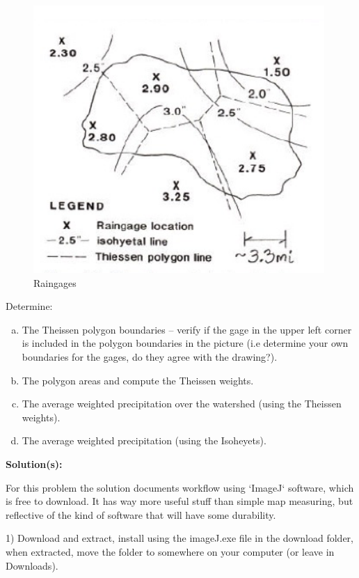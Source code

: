 \documentclass[12pt]{article}
\begin{document}
\begin{enumerate}
\begin{figure}[h!] %
   \centering
   \includegraphics[height=4in]{polygonmap.png} 
   \caption{Raingages}
   \label{fig:polygonmap}
\end{figure}

Determine:
    \begin{enumerate}[a)]
        \item The Theissen polygon boundaries – verify if the gage in the upper left corner is included in the polygon boundaries in the picture (i.e determine your own boundaries for the gages, do they agree with the drawing?). 
        \item The polygon areas and compute the Theissen weights.
        \item The average weighted precipitation over the watershed (using the Theissen weights).
        \item The average weighted precipitation (using the Isoheyets).
    \end{enumerate}

\textbf{Solution(s):}

For this problem the solution documents workflow using `ImageJ` software, which is free to download.  It has way more useful stuff than simple map measuring, but reflective of the kind of software that will have some durability.

1) Download and extract, install using the imageJ.exe file in the download folder, when extracted, move the folder to somewhere on your computer (or leave in Downloads).  


\end{enumerate}
\end{document}
